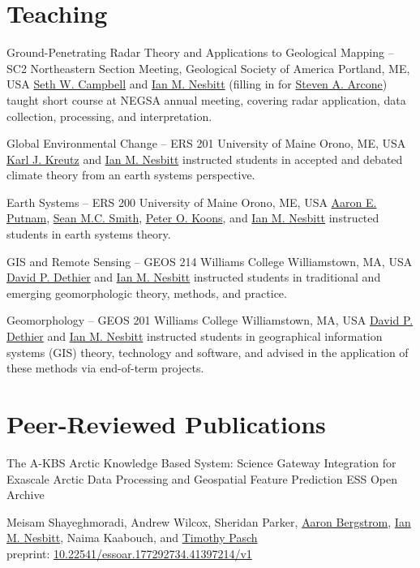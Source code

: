 \documentclass[a4paper,12pt,sans,colorlinks]{moderncv}
\newcommand{\me}{\href{https://www.iannesbitt.org}{Ian M. Nesbitt}}
\newcommand{\seth}{\href{https://www.alpinesciences.net}{Seth W. Campbell}}
\newcommand{\sean}{\href{https://umaine.edu/earthclimate/people/sean-m-c-smith/}{Sean M.C. Smith}}
\newcommand{\stevearcone}{\href{https://engineering.dartmouth.edu/community/faculty/steven-arcone}{Steven A. Arcone}}
\newcommand{\peter}{\href{https://umaine.edu/earthclimate/people/peter-koons/}{Peter O. Koons}}
\newcommand{\aaron}{\href{https://umaine.edu/earthclimate/people/aaron-putnam/}{Aaron E. Putnam}}
\newcommand{\karl}{\href{https://umaine.edu/earthclimate/people/karl-kreutz/}{Karl J. Kreutz}}
\newcommand{\david}{\href{https://geosciences.williams.edu/profile/ddethier/}{David P. Dethier}}
\newcommand{\meisamshayeghmoradi}{Meisam Shayeghmoradi}
\newcommand{\andrewwilcox}{Andrew Wilcox}
\newcommand{\sheridanparker}{Sheridan Parker}
\newcommand{\aaronbergstrom}{\href{https://orcid.org/0000-0002-0025-1737}{Aaron Bergstrom}}
\newcommand{\naimakaabouch}{Naima Kaabouch}
\newcommand{\timothypasch}{\href{https://orcid.org/0000-0002-6014-8942}{Timothy Pasch}}
\newcommand{\doi}[1]{%
    \href{https://doi.org/#1}{#1}
}
\begin{document}
\section{Teaching}


{Ground-Penetrating Radar Theory and Applications to Geological
Mapping -- SC2}
{Northeastern Section Meeting, Geological Society of America}
{Portland, ME, USA}
{}
{
    \seth{} and \me{} (filling in for \stevearcone{}) taught
    short course at NEGSA annual meeting, covering radar application,
    data collection, processing, and interpretation.
}

{Global Environmental Change -- ERS 201}
{University of Maine}
{Orono, ME, USA}
{}
{
    \karl{} and \me{} instructed students in accepted and
    debated climate theory from an earth systems perspective.
}

{Earth Systems -- ERS 200}
{University of Maine}
{Orono, ME, USA}
{}
{
    \aaron{}, \sean{}, \peter{}, and \me{} instructed students
    in earth systems theory.
}

{GIS and Remote Sensing -- GEOS 214}
{Williams College}
{Williamstown, MA, USA}
{}
{
    \david{} and \me{} instructed students in traditional and
    emerging geomorphologic theory, methods, and practice.
}

{Geomorphology -- GEOS 201}
{Williams College}
{Williamstown, MA, USA}
{}
{
    \david{} and \me{}
    instructed students in geographical information systems (GIS)
    theory, technology and software, and advised in the
    application of these methods via end-of-term projects.
}




\section{Peer-Reviewed Publications}


{The A-KBS Arctic Knowledge Based System: Science Gateway Integration for Exascale Arctic Data Processing and Geospatial Feature Prediction}
{ESS Open Archive}
{}
{}
{
    \meisamshayeghmoradi{}, \andrewwilcox{}, \sheridanparker{}, \aaronbergstrom{},
    \me{}, \naimakaabouch{}, and \timothypasch{}
    \\
    preprint: \doi{10.22541/essoar.177292734.41397214/v1}
}
\end{document}
